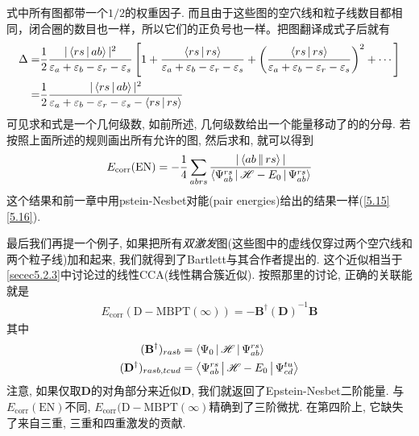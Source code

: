 式中所有图都带一个$1/2$的权重因子. 而且由于这些图的空穴线和粒子线数目都相同，闭合圈的数目也一样，所以它们的正负号也一样。把图翻译成式子后就有
\begin{align*}
\Delta =& \frac{1}{2}\frac{|\Braket{rs|ab}|^2}{\varepsilon_{a}+\varepsilon_{b}-\varepsilon_{r}-\varepsilon_{s}}\left[ 1+ \frac{\Braket{rs|rs}}{\varepsilon_{a}+\varepsilon_{b}-\varepsilon_{r}-\varepsilon_{s}}+ \left( \frac{\Braket{rs|rs}}{\varepsilon_{a}+\varepsilon_{b}-\varepsilon_{r}-\varepsilon_{s}}\right)^2 + \cdots \right]\\
=& \frac{1}{2}\frac{|\Braket{rs|ab}|^2}{\varepsilon_{a}+\varepsilon_{b}-\varepsilon_{r}-\varepsilon_{s} - \Braket{rs|rs}}
\end{align*}
可见求和式是一个几何级数, 如前所述, 几何级数给出一个能量移动了的的分母. 若按照上面所述的规则画出所有允许的图, 然后求和, 就可以得到
\begin{align}
E_\mathrm{corr}(\mathrm{EN}) = -\frac{1}{4}\sum_{abrs}\frac{|\Braket{ab||rs}|}{\Braket{\Psi_{ab}^{rs}|\mathscr{H}-E_0|\Psi_{ab}^{rs}}}
\end{align}
这个结果和前一章中用pstein-Nesbet对能(pair energies)给出的结果一样(\ref{5.15}\ref{5.16}).

最后我们再提一个例子, 如果把所有\emph{双激发}图(这些图中的虚线仅穿过两个空穴线和两个粒子线)加和起来, 我们就得到了Bartlett与其合作者提出的. 这个近似相当于\ref{secec5.2.3}中讨论过的线性CCA(线性耦合簇近似). 按照那里的讨论, 正确的关联能就是
\begin{align}
E_\mathrm{corr}(\mathrm{D-MBPT}(\infty)) = -\mathbf{B^\dagger(D)}^{-1}\mathbf{B}
\end{align}
其中
\begin{subequations}
\begin{align}
(\mathbf{B}^\dagger)_{rasb} &= \Braket{\Psi_0|\mathscr{H}|\Psi_{ab}^{rs}}\\
(\mathbf{D}^\dagger)_{rasb,tcud} &= \Braket{\Psi_{ab}^{rs}|\mathscr{H}-E_0|\Psi_{cd}^{tu}}
\end{align}
\end{subequations}
注意, 如果仅取$\mathbf{D}$的对角部分来近似$\mathbf{D}$, 我们就返回了Epstein-Nesbet二阶能量. 与$E_\mathrm{corr}(\mathrm{EN})$不同, $E_\mathrm{corr}(\mathrm{D-MBPT}(\infty)$精确到了三阶微扰. 在第四阶上, 它缺失了来自三重, 三重和四重激发的贡献.

